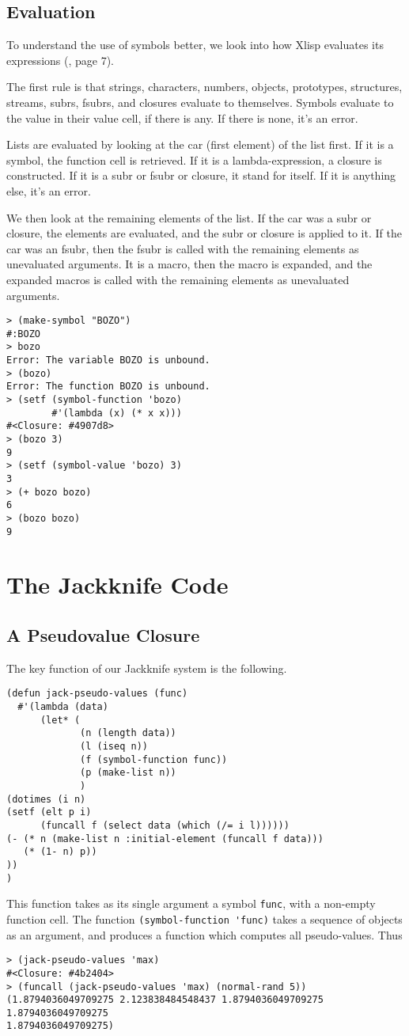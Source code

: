 \documentclass{amsart}
\theoremstyle{definition}
\theoremstyle{remark}
\numberwithin{equation}{section}
\begin{document}
\subsection{Evaluation}
%
To understand the use of symbols better, we look into how Xlisp
evaluates its expressions (\cite{almy}, page 7).\par
%
The first rule is that strings, characters, numbers, objects,
prototypes, structures, streams, subrs, fsubrs, and closures evaluate
to themselves. Symbols evaluate to the value in their value cell, if
there is any. If there is none, it's an error.\par
%
Lists are evaluated by looking at the car (first element) of the list
first. If it is a symbol, the function cell is retrieved. If it
is a lambda-expression, a closure is constructed. If it is a
subr or fsubr or closure, it stand for itself. If it is
anything else, it's an error.\par
%
We then look at the remaining elements of the list. If the car was a subr or
closure, the elements are evaluated, and the subr or closure is
applied to it. If the car was an fsubr, then the fsubr is called
with the remaining elements as unevaluated arguments. It is a macro, then
the macro is expanded, and the expanded macros is called with
the remaining elements as unevaluated arguments.\par
% 
\begin{verbatim}
> (make-symbol "BOZO")
#:BOZO
> bozo
Error: The variable BOZO is unbound.
> (bozo)
Error: The function BOZO is unbound.
> (setf (symbol-function 'bozo) 
        #'(lambda (x) (* x x)))
#<Closure: #4907d8>
> (bozo 3)
9
> (setf (symbol-value 'bozo) 3)
3
> (+ bozo bozo)
6
> (bozo bozo)
9
\end{verbatim}
%
\section{The Jackknife Code}
%
\subsection{A Pseudovalue Closure}
%
The key function of our Jackknife system is the following.
\begin{verbatim}
(defun jack-pseudo-values (func)
  #'(lambda (data)
      (let* (
             (n (length data))
             (l (iseq n))
             (f (symbol-function func))
             (p (make-list n))
             )
(dotimes (i n)
(setf (elt p i)
      (funcall f (select data (which (/= i l))))))
(- (* n (make-list n :initial-element (funcall f data)))
   (* (1- n) p))
))
)
\end{verbatim}
%
This function takes as its single argument a symbol \texttt{func},
with a non-empty function cell. The function 
\verb+(symbol-function 'func)+ takes a sequence of objects
as an argument, and produces a function which
computes all pseudo-values. Thus
%
\begin{verbatim}
> (jack-pseudo-values 'max)
#<Closure: #4b2404>
> (funcall (jack-pseudo-values 'max) (normal-rand 5))
(1.8794036049709275 2.123838484548437 1.8794036049709275 1.8794036049709275
1.8794036049709275)
\end{verbatim}
%
\end{document}

